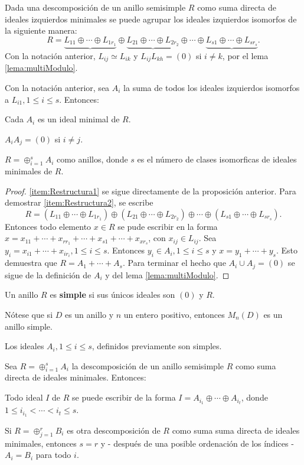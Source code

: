 Dada una descomposición de un anillo semisimple $R$ como suma directa de ideales izquierdos minimales se puede agrupar los ideales izquierdos isomorfos de la siguiente manera:
\[ R = \underbrace{L_{11}\oplus \cdots \oplus L_{1r_1}} \oplus \underbrace{L_{21}\oplus \cdots \oplus L_{2r_2}} \oplus \cdots  \oplus \underbrace{L_{s1}\oplus \cdots \oplus L_{sr_s}}. \]
Con la notación anterior, $L_{ij} \simeq L_{ik}$ y $L_{ij}L_{kh} = (0)$ si $i \neq k$, por el lema \ref{lema:multiModulo}. 
\begin{teorema}
Con la notación anterior, sea $A_i$ la suma de todos los ideales izquierdos isomorfos a $L_{i1}, 1\leq i \leq s$. Entonces:
\begin{bulletList}
\item\label{item:Restructura1} Cada $A_i$ es un ideal minimal de $R$.
\item\label{item:Restructura2} $A_iA_j = (0)$ si $i \neq j$.
\item\label{item:Restructura3} $R = \oplus_{i=1}^{s}A_i$ como anillos, donde $s$ es el número de clases isomorficas de ideales minimales de $R$.
\end{bulletList}
\end{teorema}
\begin{proof}
\ref{item:Restructura1} se sigue directamente de la proposición anterior. Para demostrar \ref{item:Restructura2}, se escribe \[ R = (L_{11}\oplus \cdots \oplus L_{1r_1}) \oplus (L_{21}\oplus \cdots \oplus L_{2r_2}) \oplus \cdots  \oplus (L_{s1}\oplus \cdots \oplus L_{sr_s}). \]Entonces todo elemento $x \in R$ se pude escribir en la forma $x = x_{11} + \cdots + x_{rr_1} + \cdots + x_{s1} +\cdots +x_{xr_s}$, con $x_{ij} \in L_{ij}$. Sea $y_i = x_{i1} + \cdots + x_{ir_i}, 1\leq i \leq s$. Entonces $y_i \in A_i, 1\leq i \leq s$ y $x = y_1 + \cdots + y_s$. Esto demuestra que $R = A_1 + \cdots + A_s$. Para terminar el hecho que $A_i\cup A_j = (0)$ se sigue de la definición de $A_i$ y del lema \ref{lema:multiModulo}. 
\end{proof}
\begin{definicion}
Un anillo $R$ es \textbf{simple} si sus únicos ideales son $(0)$ y $R$.
\end{definicion}
Nótese que si $D$ es un anillo y $n$ un entero positivo, entonces $M_n(D)$ es un anillo simple.
\begin{corolario}
Los ideales $A_i, 1\leq i \leq s$, definidos previamente son simples.
\end{corolario}
\begin{proposicion}\label{prop:unicidadDescomposicion}
Sea $R = \oplus_{i=1}^s A_i$ la descomposición de un anillo semisimple $R$ como suma directa de ideales minimales. Entonces:
\begin{bulletList}
\item Todo ideal $I$ de $R$ se puede escribir de la forma $I = A_{i_1} \oplus \cdots \oplus A_{i_t}$, donde $1\leq i_{i_1} < \cdots < i_{t} \leq s$.
\item Si $R = \oplus_{j = 1}^rB_i$ es otra descomposición de $R$ como suma suma directa de ideales minimales, entonces $s = r$ y - después de una posible ordenación de los índices - $A_i = B_i$ para todo $i$.
\end{bulletList}
\end{proposicion}
